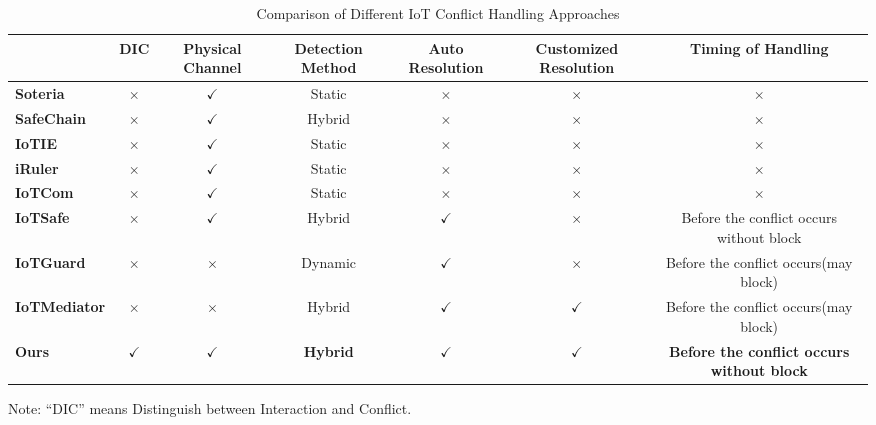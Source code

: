 \begin{table*}[htbp]
	\begin{center}
		\caption{Comparison of Different IoT Conflict Handling Approaches}
		\label{Relate_Work}
		\begin{adjustbox}{width=0.95\textwidth}
			\begin{tabular}{|l|c|c|c|c|c|c|}
				\hline
				& \textbf{DIC} & \textbf{Physical Channel} & \textbf{Detection Method} & \textbf{Auto Resolution} & \textbf{Customized Resolution} & \textbf{Timing of Handling} \\
				\hline
				\textbf{Soteria\cite{celik2018soteria}} & $\times$ & $\checkmark$ & Static & $\times$ & $\times$ & $\times$ \\
				\hline
				\textbf{SafeChain\cite{hsu2019safechain}} & $\times$ & $\checkmark$ & Hybrid & $\times$ & $\times$ & $\times$ \\
				\hline
				\textbf{IoTIE\cite{chen2019multi}} & $\times$ & $\checkmark$ & Static & $\times$ & $\times$ & $\times$ \\
				\hline
				\textbf{iRuler\cite{wang2019charting}} & $\times$ & $\checkmark$ & Static & $\times$ & $\times$ & $\times$ \\
				\hline
				\textbf{IoTCom\cite{alhanahnah2022iotcom}} & $\times$ & $\checkmark$ & Static & $\times$ & $\times$ & $\times$ \\
				\hline
				\textbf{IoTSafe\cite{ding2021iotsafe}} & $\times$ & $\checkmark$ & Hybrid & $\checkmark$ & $\times$ & Before the conflict occurs without block \\
				\hline
				\textbf{IoTGuard\cite{celik2019iotguard}} & $\times$ & $\times$ & Dynamic & $\checkmark$ & $\times$ & Before the conflict occurs(may block) \\
				\hline
				\textbf{IoTMediator\cite{chi2023detecting}} & $\times$ & $\times$ & Hybrid & $\checkmark$ & $\checkmark$ & Before the conflict occurs(may block) \\
				\hline
				\textbf{Ours} & $\checkmark$ & $\checkmark$ & \textbf{Hybrid} & $\checkmark$ & $\checkmark$ & \textbf{Before the conflict occurs without block} \\
				\hline
			\end{tabular}
		\end{adjustbox}
		\vspace{5pt}
		\raggedright
		Note: “DIC” means Distinguish between Interaction and Conflict.
	\end{center}
\end{table*}
